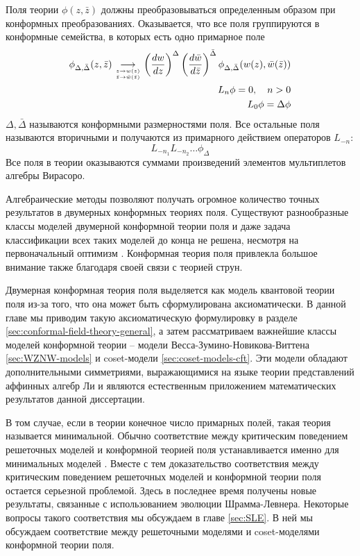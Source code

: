 Поля теории $\phi(z,\bar z)$ должны преобразовываться определенным образом при конформных преобразованиях.
Оказывается, что все поля группируются в конформные семейства, в которых есть одно примарное поле
\begin{equation}
  \label{eq:3}
  \begin{split}
    \phi_{\Delta,\bar \Delta}(z,\bar z)\underset{
      \genfrac{}{}{0pt}{}{z\to w(z)}
        {\bar z \to \bar w(\bar z)}
    }
    {\longrightarrow} \left(\frac{dw}{dz}\right)^{\Delta}\left(\frac{d\bar w}{d\bar
        z}\right)^{\bar\Delta}\phi_{\Delta,\bar \Delta}(w(z),\bar w(\bar z))\\
    L_n \phi=0,\quad n>0\\
    L_0 \phi=\Delta \phi\\
  \end{split}
\end{equation}
$\Delta, \bar \Delta$ называются конформными размерностями поля.
Все остальные поля называются вторичными и получаются из примарного действием операторов $L_{-n}$:
\begin{equation}
  \label{eq:67}
  L_{-n_1}L_{-n_2}\dots \phi_{\Delta}
\end{equation}
Все поля в теории оказываются суммами произведений элементов мультиплетов алгебры Вирасоро.

Алгебраические методы позволяют получать огромное количество точных результатов в двумерных конформных теориях поля. Существуют разнообразные классы моделей двумерной конформной теории поля и даже задача классификации всех таких моделей до конца не решена, несмотря на первоначальный оптимизм \cite{moore1989taming}.  Конформная теория поля привлекла большое внимание также благодаря своей связи с теорией струн.

Двумерная конформная теория поля выделяется как модель квантовой теории поля из-за того, что она может быть сформулирована аксиоматически. В данной главе мы приводим такую аксиоматическую формулировку в разделе \ref{sec:conformal-field-theory-general}, а затем рассматриваем важнейшие классы моделей конформной теории -- модели Весса-Зумино-Новикова-Виттена \ref{sec:WZNW-models} и coset-модели \ref{sec:coset-models-cft}. Эти модели обладают дополнительными симметриями, выражающимися на языке теории представлений аффинных алгебр Ли и являются естественным приложением математических результатов данной диссертации. 

В том случае, если в теории конечное число примарных полей, такая теория называется минимальной. Обычно соответствие между критическим поведением решеточных моделей и конформной теорией поля устанавливается именно для минимальных моделей \cite{bauer2004cfts,bauer2003sle,bauer2003conformal}. Вместе с тем доказательство соответствия между критическим поведением решеточных моделей и конформной теории поля остается серьезной проблемой. Здесь в последнее время получены новые результаты, связанные с использованием эволюции Шрамма-Левнера. Некоторые вопросы такого соответствия мы обсуждаем в главе \ref{sec:SLE}. В ней мы обсуждаем соответствие между решеточными моделями и coset-моделями конформной теории поля.

